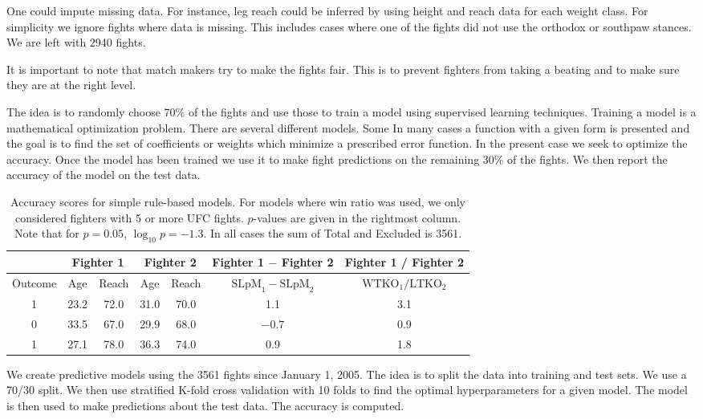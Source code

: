 One could impute missing data. For instance, leg reach
could be inferred by using height and reach data for
each weight class. For simplicity we ignore fights
where data is missing. This includes cases where one
of the fights did not use the orthodox or southpaw
stances. We are left with 2940 fights.

It is important to note that match makers try to make
the fights fair. This is to prevent fighters from taking
a beating and to make sure they are at the right level.

The idea is to randomly choose 70\% of the fights and
use those to train a model using supervised
learning techniques.
Training a model is a mathematical optimization problem.
There are several different models. Some 
In many cases a function with a given form is presented
and the goal is to find the set of coefficients or weights
which minimize a prescribed error function. In the present
case we seek to optimize the accuracy.
Once the model has been
trained we use it to make fight predictions on
the remaining 30\% of the fights. We then report the
accuracy of the model on the test data.

\begin{center}
\begin{table}[h]
\begin{tabular}{c|cccccc}
  \toprule
  {} &  \multicolumn{2}{c}{{Fighter 1}} & \multicolumn{2}{c}{{Fighter 2}} & Fighter 1 $-$ Fighter 2 & Fighter 1 / Fighter 2\\
  \hline
  Outcome & Age & Reach & Age & Reach & $\textrm{SLpM}_1 - \textrm{SLpM}_2$ & $\textrm{WTKO}_1/\textrm{LTKO}_2$\\
  \hline
  1 & 23.2 & 72.0 & 31.0 & 70.0 & 1.1 & 3.1\\
  0 & 33.5 & 67.0 & 29.9 & 68.0 & $-0.7$ & 0.9\\
  1 & 27.1 & 78.0 & 36.3 & 74.0 & 0.9 & 1.8\\
  \bottomrule
\end{tabular}
\caption{Accuracy scores for simple rule-based models. For models where win ratio was used, we only considered
fighters with 5 or more UFC fights. $p$-values are given in the rightmost column. Note that for $p=0.05$, $\log_{10}p = -1.3$. In all
cases the sum of
Total and Excluded is 3561.}
\label{sample_labels_features}
\end{table}
\end{center}


We create predictive models using the 3561 fights since
January 1, 2005. The idea is to split the data into
training and test sets. We use a 70/30 split. We then
use stratified K-fold cross validation with 10 folds
to find the optimal
hyperparameters for a given model. The model is then
used to make predictions about the test data. The accuracy
is computed.

